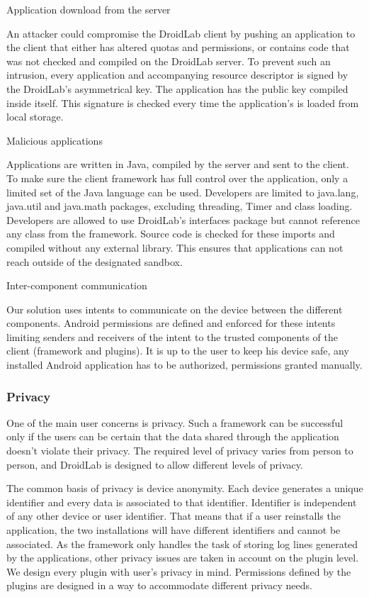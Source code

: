 \documentclass[conference,letterpaper]{IEEEtran}
\begin{document}
Application download from the server

An attacker could compromise the DroidLab client by pushing an application to the client that either has altered quotas and permissions, or contains code that was not checked and compiled on the DroidLab server. To prevent such an intrusion, every application and accompanying resource descriptor is signed by the DroidLab's asymmetrical key. The application has the public key compiled inside itself. This signature is checked every time the application's is loaded from local storage.

Malicious applications

Applications are written in Java, compiled by the server and sent to the client. To make sure the client framework has full control over the application, only a limited set of the Java language can be used. Developers are limited to java.lang, java.util and java.math packages, excluding threading, Timer and class loading. Developers are allowed to use DroidLab's interfaces package but cannot reference any class from the framework. Source code is checked for these imports and compiled without any external library. This ensures that applications can not reach outside of the designated sandbox.

Inter-component communication

Our solution uses intents to communicate on the device between the different components. Android permissions are defined and enforced for these intents limiting senders and receivers of the intent to the trusted components of the client (framework and plugins). It is up to the user to keep his device safe, any installed Android application has to be authorized, permissions granted manually.


\subsubsection{Privacy}

One of the main user concerns is privacy. Such a framework can be successful only if the users can be certain that the data shared through the application doesn't violate their privacy. The required level of privacy varies from person to person, and DroidLab is designed to allow different levels of privacy.

The common basis of privacy is device anonymity. Each device generates a unique identifier and every data is associated to that identifier. Identifier is independent of any other device or user identifier. That means that if a user reinstalls the application, the two installations will have different identifiers and cannot be associated. As the framework only handles the task of storing log lines generated by the applications, other privacy issues are taken in account on the plugin level. We design every plugin with user's privacy in mind. Permissions defined by the plugins are designed in a way to accommodate different privacy needs.
\end{document}
